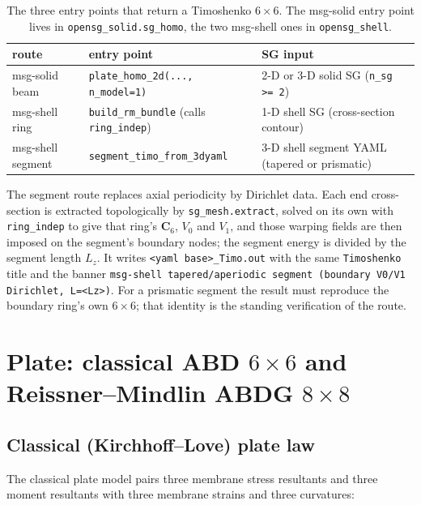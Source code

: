 \begin{table}[htbp]
\centering
\caption{The three entry points that return a Timoshenko $6\times6$. The
msg-solid entry point lives in \texttt{opensg\_solid.sg\_homo}, the two
msg-shell ones in \texttt{opensg\_shell}.}
\label{tab:beamroutes}
\footnotesize
\begin{tabular}{lll}
\toprule
route & entry point & SG input \\
\midrule
msg-solid beam & \texttt{plate\_homo\_2d(..., n\_model=1)} & 2-D or 3-D solid SG (\texttt{n\_sg >= 2}) \\
msg-shell ring & \texttt{build\_rm\_bundle} (calls \texttt{ring\_indep}) & 1-D shell SG (cross-section contour) \\
msg-shell segment & \texttt{segment\_timo\_from\_3dyaml} & 3-D shell segment YAML (tapered or prismatic) \\
\bottomrule
\end{tabular}
\end{table}

The segment route replaces axial periodicity by Dirichlet data. Each end
cross-section is extracted topologically by \texttt{sg\_mesh.extract}, solved on
its own with \texttt{ring\_indep} to give that ring's $\mathbf C_6$, $V_0$ and
$V_1$, and those warping fields are then imposed on the segment's boundary
nodes; the segment energy is divided by the segment length
$L_z$. It writes \texttt{<yaml base>\_Timo.out} with the same
\texttt{Timoshenko} title and the banner
\verb|msg-shell tapered/aperiodic segment (boundary V0/V1 Dirichlet, L=<Lz>)|.
For a prismatic segment the result must reproduce the boundary ring's own
$6\times6$; that identity is the standing verification of the route.

\section{Plate: classical ABD $6\times6$ and Reissner--Mindlin ABDG $8\times8$}
\label{sec:plate}

\subsection{Classical (Kirchhoff--Love) plate law}

The classical plate model pairs three membrane stress resultants and three
moment resultants with three membrane strains and three curvatures:

